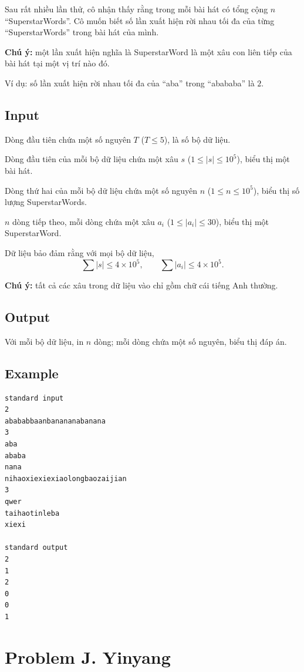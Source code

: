 \documentclass[11pt]{article}
\begin{document}
Sau rất nhiều lần thử, cô nhận thấy rằng trong mỗi bài hát có tổng cộng $n$
``SuperstarWords''. Cô muốn biết số lần xuất hiện rời nhau tối đa của từng
``SuperstarWords'' trong bài hát của mình.

\textbf{Chú ý:} một lần xuất hiện nghĩa là SuperstarWord là một xâu con liên
tiếp của bài hát tại một vị trí nào đó.

Ví dụ: số lần xuất hiện rời nhau tối đa của ``aba'' trong ``abababa'' là $2$.

\subsection*{Input}

Dòng đầu tiên chứa một số nguyên $T$ ($T\le 5$), là số bộ dữ liệu.

Dòng đầu tiên của mỗi bộ dữ liệu chứa một xâu $s$ ($1\le |s|\le 10^5$), biểu
thị một bài hát.

Dòng thứ hai của mỗi bộ dữ liệu chứa một số nguyên $n$ ($1\le n\le 10^5$),
biểu thị số lượng SuperstarWords.

$n$ dòng tiếp theo, mỗi dòng chứa một xâu $a_i$ ($1\le |a_i|\le 30$), biểu
thị một SuperstarWord.

Dữ liệu bảo đảm rằng với mọi bộ dữ liệu,
\[
  \sum |s|\le 4\times 10^5,\qquad \sum |a_i|\le 4\times 10^5.
\]

\textbf{Chú ý:} tất cả các xâu trong dữ liệu vào chỉ gồm chữ cái tiếng Anh
thường.

\subsection*{Output}

Với mỗi bộ dữ liệu, in $n$ dòng; mỗi dòng chứa một số nguyên, biểu thị đáp án.

\subsection*{Example}

\begin{verbatim}
standard input
2
abababbaanbanananabanana
3
aba
ababa
nana
nihaoxiexiexiaolongbaozaijian
3
qwer
taihaotinleba
xiexi

standard output
2
1
2
0
0
1
\end{verbatim}

\section{Problem J. Yinyang}
\end{document}
